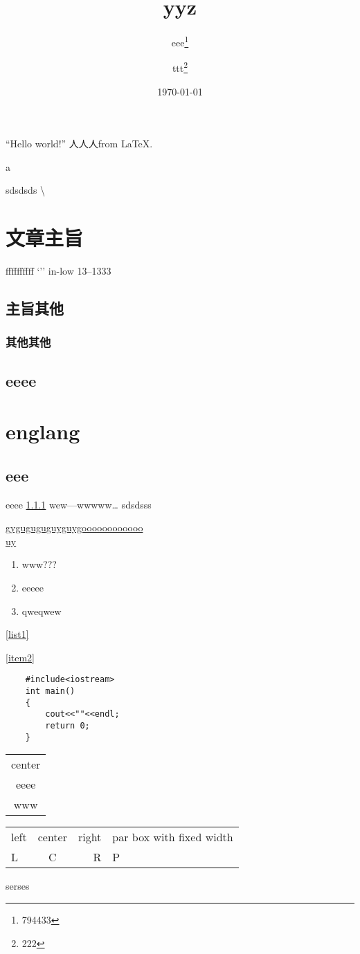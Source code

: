\documentclass[UTF8]{ctexart}
\title{yyz}
\author{eee\thanks{794433}\and ttt\thanks{222}}
\date{\today}
\begin{document}
\maketitle
``Hello world!'' 人人人from \LaTeX.

\tableofcontents

a \par
sdsdsds
\textbackslash

\section{文章主旨}
ffffffffff
`''
in-low
13--1333

\subsection{主旨其他}

\subsubsection{其他其他}
\label{qita}
\subsection{eeee}

\appendix

\section{englang}

\subsection{eee}
eeee 
\ref{qita}
\pageref{qita}
wew---wwwww\ldots
sdsdsss\par
\uline{gyguguguguyguygoooooooooooo
\\ uy}
\begin{enumerate}\label{list1}
    \item www???
    \item eeeee\label{item2}
    \item qweqwew
\end{enumerate}
\ref{list1}

\ref{item2}

\begin{verbatim}
    #include<iostream>
    int main()
    {
        cout<<""<<endl;
        return 0;
    }
\end{verbatim}
\begin{tabular}{|c|}
    center\\
    eeee\\
    www
\end{tabular}
\begin{tabular}{lcr|p{6em}}
    \hline
    left & center & right
    & par box with fixed width\\
    L & C & R & P \\
    \hline
\end{tabular}
\newpage
serses
\end{document}
